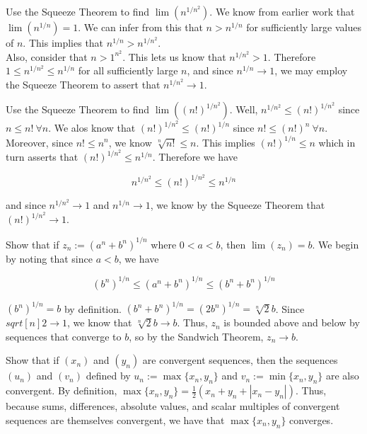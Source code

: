 \documentclass[paper=a4, fontsize=11pt]{scrartcl} %
\numberwithin{equation}{section} %
\numberwithin{figure}{section} %
\numberwithin{table}{section} %
\begin{document}
 Use the Squeeze Theorem to find $\lim(n^{1/n^2})$.
\pf We know from earlier work that $\lim(n^{1/n}) = 1$. We can infer from this that $n > n^{1/n}$ for sufficiently large values of $n$. This implies that $n^{1/n} > n^{1/n^2}$.\\

Also, consider that $n > 1^{n^2}$. This lets us know that $n^{1/n^2} > 1$. Therefore $1 \leq n^{1/n^2} \leq n^{1/n}$ for all sufficiently large $n$, and since $n^{1/n} \rightarrow 1$, we may employ the Squeeze Theorem to assert that $n^{1/n^2} \rightarrow 1$. \done

 Use the Squeeze Theorem to find $\lim((n!)^{1/n^2})$.
\pf Well, $n^{1/n^2} \leq (n!)^{1/n^2}$ since $n \leq n! ~ \forall n$. We alos know that $(n!)^{1/n^2} \leq (n!)^{1/n}$ since $n! \leq (n!)^n ~ \forall n$. Moreover, since $n! \leq n^n$, we know $\sqrt[n]{n!} \leq n$. This implies $(n!)^{1/n} \leq n$ which in turn asserts that $(n!)^{1/n^2} \leq n^{1/n}$. Therefore we have

\begin{equation*}
n^{1/n^2} \leq (n!)^{1/n^2} \leq n^{1/n}
\end{equation*}

and since $n^{1/n^2} \rightarrow 1$ and $n^{1/n} \rightarrow 1$, we know by the Squeeze Theorem that $ (n!)^{1/n^2} \rightarrow 1$. \done

 Show that if $z_n := (a^n + b^n)^{1/n}$ where $0 < a < b$, then $\lim(z_n) = b$.
\pf We begin by noting that since $a < b$, we have

\begin{equation*}
(b^n)^{1/n} \leq (a^n + b^n)^{1/n} \leq (b^n + b^n)^{1/n}
\end{equation*}

$(b^n)^{1/n} = b$ by definition. $(b^n + b^n)^{1/n} = (2b^n)^{1/n} = \sqrt[n]{2} b$. Since $sqrt[n]{2} \rightarrow 1$, we know that $\sqrt[n]{2} b \rightarrow b$. Thus, $z_n$ is bounded above and below by sequences that converge to $b$, so by the Sandwich Theorem, $z_n \rightarrow b$. \done

 Show that if $(x_n)$ and $(y_n)$ are convergent sequences, then the sequences $(u_n)$ and $(v_n)$ defined by $u_n := \max\{x_n, y_n\}$ and $v_n := \min\{x_n, y_n\}$ are also convergent.
\pf By definition, $\max\{x_n, y_n\} = \frac{1}{2}(x_n + y_n + |x_n - y_n|)$. Thus, because sums, differences, absolute values, and scalar multiples of convergent sequences are themselves convergent, we have that $\max\{x_n, y_n\}$ converges.\\
\end{document}
